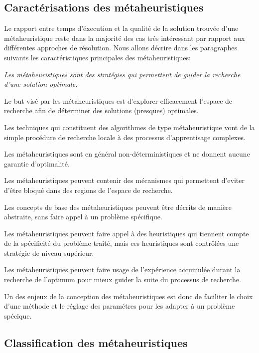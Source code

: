 \documentclass[a4paper,11pt,oneside]{report}
\theoremstyle{plain}
\newcommand{\0}{/ \! \! \! 0}
\theoremstyle{plain}
\begin{document}
\subsection{Caract\'erisations des m\'etaheuristiques}
 Le rapport entre temps d'\'execution et la qualit\'e de la solution trouv\'ee d'une m\'etaheuristique reste dans la majorit\'e des cas tr\'es int\'eressant 
par rapport aux diff\'erentes approches de r\'esolution.
Nous allons d\'ecrire dans les paragraphes suivants les caract\'eristiques principales des m\'etaheuristiques: 

{\bf{\it
{} Les m\'etaheuristiques sont des strat\'egies qui permettent de guider la recherche d'une solution optimale.

 Le but vis\'e par les m\'etaheuristiques est d'explorer efficacement l'espace de recherche afin de d\'eterminer des solutions (presques) optimales.

 Les techniques qui constituent des algorithmes de type m\'etaheuristique vont de la simple proc\'edure de recherche locale \`a des processus 
d'apprentisage complexes.

 Les m\'etaheuristiques sont en g\'en\'eral non-d\'eterministiques et ne donnent aucune garantie d'optimalit\'e.

 Les m\'etaheuristiques peuvent contenir des m\'ecanismes qui permettent d'eviter d'\^etre bloqu\'e dans des regions de l'espace de recherche.

 Les concepts de base des m\'etaheuristiques peuvent \^etre d\'ecrits de mani\`ere abstraite, sans faire appel \`a un probl\`eme sp\'ecifique.

 Les m\'etaheuristiques peuvent faire appel \`a des heuristiques qui tiennent compte de la sp\'ecificit\'e du probl\`eme trait\'e, mais ces
heuristiques sont contr\^ol\'ees une strat\'egie de niveau sup\'erieur.

 Les m\'etaheuristiques peuvent faire usage de l'exp\'erience accumul\'ee durant la recherche de l'optimum pour mieux guider la suite du processus de 
recherche.

  Un des enjeux de la conception des m\'etaheuristiques est donc de faciliter le choix d'une m\'ethode et le r\'eglage des param\'etres pour
les adapter \`a un probl\`eme sp\'ecique.
}}
\subsection{Classification des m\'etaheuristiques}
\end{document}
